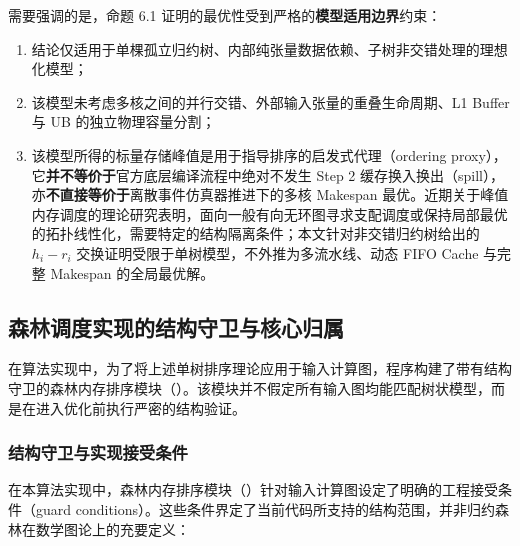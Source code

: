 \documentclass[anonymous,notoc]{gmcm2026}
\providecommand{\tightlist}{\setlength{\itemsep}{0pt}\setlength{\parskip}{0pt}}
\begin{document}
需要强调的是，命题 6.1 证明的最优性受到严格的\textbf{模型适用边界}约束：

\begin{enumerate}
\def\labelenumi{\arabic{enumi}.}
\tightlist
\item
  结论仅适用于单棵孤立归约树、内部纯张量数据依赖、子树非交错处理的理想化模型；
\item
  该模型未考虑多核之间的并行交错、外部输入张量的重叠生命周期、L1 Buffer 与 UB 的独立物理容量分割；
\item
  该模型所得的标量存储峰值是用于指导排序的启发式代理（ordering proxy），它\textbf{并不等价于}官方底层编译流程中绝对不发生 Step 2 缓存换入换出（spill），亦\textbf{不直接等价于}离散事件仿真器推进下的多核 Makespan 最优。近期关于峰值内存调度的理论研究表明，面向一般有向无环图寻求支配调度或保持局部最优的拓扑线性化，需要特定的结构隔离条件\cite{ref10}；本文针对非交错归约树给出的 \(h_i - r_i\) 交换证明受限于单树模型，不外推为多流水线、动态 FIFO Cache 与完整 Makespan 的全局最优解。
\end{enumerate}

\subsection{森林调度实现的结构守卫与核心归属}

在算法实现中，为了将上述单树排序理论应用于输入计算图，程序构建了带有结构守卫的森林内存排序模块（\texttt{}）。该模块并不假定所有输入图均能匹配树状模型，而是在进入优化前执行严密的结构验证。

\subsubsection{结构守卫与实现接受条件}

在本算法实现中，森林内存排序模块（\texttt{}）针对输入计算图设定了明确的工程接受条件（guard conditions）。这些条件界定了当前代码所支持的结构范围，并非归约森林在数学图论上的充要定义：
\end{document}
